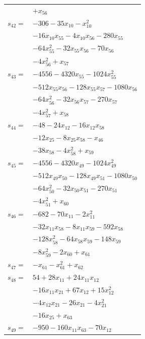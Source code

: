 \begin{longtable}{@{}r@{\;}l@{}}
 & \(\displaystyle +x_{56}\) \\[3pt]
\(s_{42}=\) & \(\displaystyle -306 -35x_{10} -x_{10}^{2}\) \\
 & \(\displaystyle -16x_{10}x_{55} -4x_{10}x_{56} -280x_{55}\) \\
 & \(\displaystyle -64x_{55}^{2} -32x_{55}x_{56} -70x_{56}\) \\
 & \(\displaystyle -4x_{56}^{2} +x_{57}\) \\[3pt]
\(s_{43}=\) & \(\displaystyle -4556 -4320x_{55} -1024x_{55}^{2}\) \\
 & \(\displaystyle -512x_{55}x_{56} -128x_{55}x_{57} -1080x_{56}\) \\
 & \(\displaystyle -64x_{56}^{2} -32x_{56}x_{57} -270x_{57}\) \\
 & \(\displaystyle -4x_{57}^{2} +x_{58}\) \\[3pt]
\(s_{44}=\) & \(\displaystyle -48 -24x_{12} -16x_{12}x_{58}\) \\
 & \(\displaystyle -12x_{25} -8x_{25}x_{58} -x_{46}\) \\
 & \(\displaystyle -38x_{58} -4x_{58}^{2} +x_{59}\) \\[3pt]
\(s_{45}=\) & \(\displaystyle -4556 -4320x_{49} -1024x_{49}^{2}\) \\
 & \(\displaystyle -512x_{49}x_{50} -128x_{49}x_{51} -1080x_{50}\) \\
 & \(\displaystyle -64x_{50}^{2} -32x_{50}x_{51} -270x_{51}\) \\
 & \(\displaystyle -4x_{51}^{2} +x_{60}\) \\[3pt]
\(s_{46}=\) & \(\displaystyle -682 -70x_{11} -2x_{11}^{2}\) \\
 & \(\displaystyle -32x_{11}x_{58} -8x_{11}x_{59} -592x_{58}\) \\
 & \(\displaystyle -128x_{58}^{2} -64x_{58}x_{59} -148x_{59}\) \\
 & \(\displaystyle -8x_{59}^{2} -2x_{60} +x_{61}\) \\[3pt]
\(s_{47}=\) & \(\displaystyle -x_{61} -x_{61}^{2} +x_{62}\) \\[3pt]
\(s_{48}=\) & \(\displaystyle 54 +28x_{11} +24x_{11}x_{12}\) \\
 & \(\displaystyle -16x_{11}x_{21} +67x_{12} +15x_{12}^{2}\) \\
 & \(\displaystyle -4x_{12}x_{21} -26x_{21} -4x_{21}^{2}\) \\
 & \(\displaystyle -16x_{25} +x_{63}\) \\[3pt]
\(s_{49}=\) & \(\displaystyle -950 -160x_{11}x_{63} -70x_{12}\) \\

\end{longtable}
